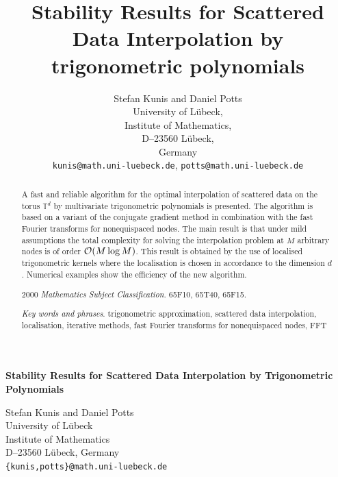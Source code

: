 \documentclass[11pt,a4paper,bibtotoc]{scrartcl}
\author{Stefan Kunis and Daniel Potts\\University of L\"ubeck,\\
Institute of Mathematics,\\
D--23560 L\"ubeck,\\
Germany\\
{\tt kunis@math.uni-luebeck.de},
{\tt potts@math.uni-luebeck.de}}
\title{Stability Results for Scattered Data Interpolation by trigonometric
  polynomials}
\def\T{\mathbb{T}}
\numberwithin{equation}{section}
\numberwithin{table}{section}
\numberwithin{figure}{section}
\begin{document}
\begin{center}
{\bf \Large
Stability Results for Scattered Data Interpolation by Trigonometric
Polynomials
 }
\end{center}

\begin{center}
Stefan Kunis and Daniel Potts\\
University of L\"ubeck\\
Institute of Mathematics\\
D--23560 L\"ubeck,
Germany\\
{\tt \{kunis,potts\}@math.uni-luebeck.de}\\[1ex]
\end{center}

\begin{abstract}
A fast and reliable algorithm for the optimal interpolation of scattered data
on the torus $\T^d$ by multivariate trigonometric polynomials is presented.
The algorithm is based on a variant of the conjugate gradient method in
combination with the fast Fourier transforms for nonequispaced nodes.
The main result is that under mild assumptions the total complexity for
solving the interpolation problem at $M$ arbitrary nodes is of order ${\cal
  O}(M\log M)$.
This result is obtained by the use of localised trigonometric kernels
where the localisation is chosen in accordance to the dimension $d$.
Numerical examples show the efficiency of the new algorithm.

\smallskip

2000 {\em Mathematics Subject Classification}. 65F10, 65T40, 65F15.

{\em Key words and phrases}. trigonometric approximation,
scattered data interpolation, localisation, iterative methods,
fast Fourier transforms for nonequispaced nodes, FFT
\end{abstract}

\end{document}
